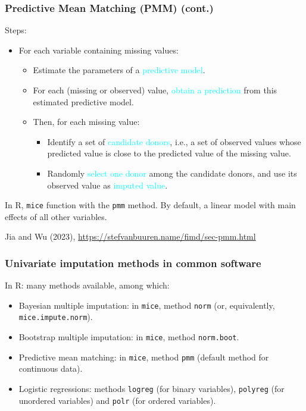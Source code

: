 \documentclass{beamer}
\begin{document}
\begin{frame}[label=main3]
\frametitle{Predictive Mean Matching (PMM) (cont.)}		

Steps:
	\begin{itemize}
		\item For each variable containing missing values: 
			\begin{itemize}
				\item Estimate the parameters of a \textcolor{cyan}{predictive model}.
				\item For each (missing or observed) value, \textcolor{cyan}{obtain a prediction} from this estimated predictive model.
				\item Then, for each missing value:
					\begin{itemize}
						\item Identify a set of \textcolor{cyan}{candidate donors}, i.e., a set of observed values whose predicted value is close to the predicted value of the missing value. 
						\item Randomly \textcolor{cyan}{select one donor} among the candidate donors, and use its observed value as \textcolor{cyan}{imputed value}.
					\end{itemize}
			\end{itemize}
	\end{itemize}
	In R, \texttt{mice} function with the \texttt{pmm} method. By default, a linear model with main effects of all other variables.



\vfill
\footnotesize{Jia and Wu (2023), \url{https://stefvanbuuren.name/fimd/sec-pmm.html}}


\end{frame}


\begin{frame}
\frametitle{Univariate imputation methods in common software}
In R: many methods available, among which:
\begin{itemize}
	\item Bayesian multiple imputation: in \texttt{mice}, method \texttt{norm} (or, equivalently, \texttt{mice.impute.norm}).
	\item Bootstrap multiple imputation: in \texttt{mice}, method \texttt{norm.boot}.
	\item Predictive mean matching: in \texttt{mice}, method \texttt{pmm} (default method for continuous data).
	\item Logistic regressions: methods \texttt{logreg} (for binary variables), \texttt{polyreg} (for unordered variables) and \texttt{polr} (for ordered variables).
\end{itemize}

\end{frame}
\end{document}
